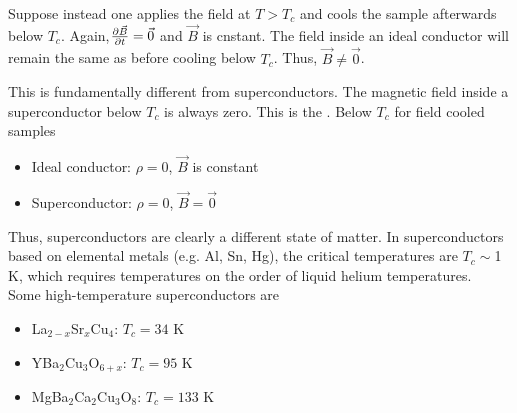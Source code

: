 \documentclass[12pt,a4paper,titlepage]{article}
\newcommand{\ul}[1]{\underline{\smash{#1}}} %
\begin{document}
Suppose instead one applies the field at $T>T_{c}$ and cools the sample afterwards below $T_{c}$. Again,$\pdv{\vec{B}}{t}=\vec{0}$ and $\vec{B}$ is cnstant. The field inside an ideal conductor will remain the same as before cooling below $T_{c}$. Thus, $\vec{B}\neq\vec{0}$.\\
\begin{center}
\end{center}
This is fundamentally different from superconductors. The magnetic field inside a superconductor below $T_{c}$ is always zero. This is the \ul{Meissner effect}. Below $T_{c}$ for field cooled samples
\begin{itemize}
\item[] Ideal conductor: $\rho=0$, $\vec{B}$ is constant
\item[] Superconductor: $\rho=0$, $\vec{B}=\vec{0}$
\end{itemize}
Thus, superconductors are clearly a different state of matter. In superconductors based on elemental metals (e.g. Al, Sn, Hg), the critical temperatures are $T_{c}\sim$1 K, which requires temperatures on the order of liquid helium temperatures.\\

Some high-temperature superconductors are
\begin{itemize}
\item[] La$_{2-x}$Sr$_{x}$Cu$_{4}$: $T_{c}=34$ K
\item[] YBa$_{2}$Cu$_{3}$O$_{6+x}$: $T_{c}=95$ K
\item[] MgBa$_{2}$Ca$_{2}$Cu$_{3}$O$_{8}$: $T_{c}=133$ K
\end{itemize}
\end{document}
